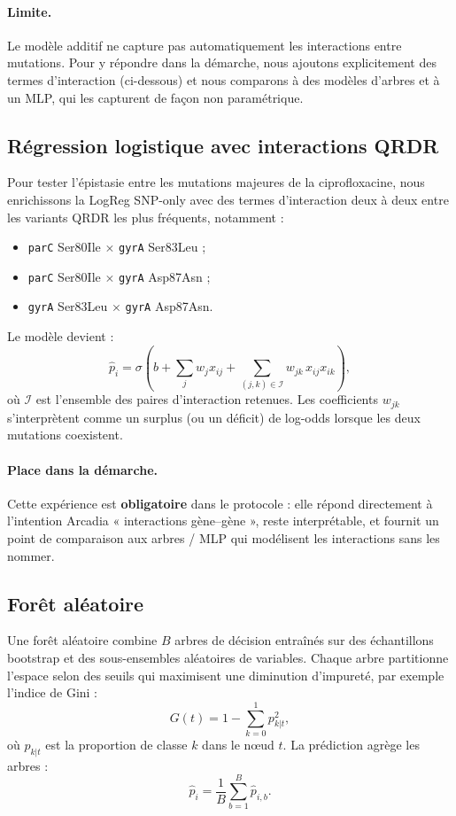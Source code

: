 \documentclass[11pt,a4paper]{article}
\begin{document}
\paragraph{Limite.}
Le modèle additif ne capture pas automatiquement les interactions entre mutations. Pour y répondre dans la démarche, nous ajoutons explicitement des termes d'interaction (ci-dessous) et nous comparons à des modèles d'arbres et à un MLP, qui les capturent de façon non paramétrique.

\subsection{Régression logistique avec interactions QRDR}

Pour tester l'épistasie entre les mutations majeures de la ciprofloxacine, nous enrichissons la LogReg SNP-only avec des termes d'interaction deux à deux entre les variants QRDR les plus fréquents, notamment :
\begin{itemize}[leftmargin=1.2em]
    \item \texttt{parC} Ser80Ile $\times$ \texttt{gyrA} Ser83Leu ;
    \item \texttt{parC} Ser80Ile $\times$ \texttt{gyrA} Asp87Asn ;
    \item \texttt{gyrA} Ser83Leu $\times$ \texttt{gyrA} Asp87Asn.
\end{itemize}
Le modèle devient :
\[
\hat p_i = \sigma\!\left(
b + \sum_j w_j x_{ij} + \sum_{(j,k)\in\mathcal{I}} w_{jk}\, x_{ij}x_{ik}
\right),
\]
où \(\mathcal{I}\) est l'ensemble des paires d'interaction retenues. Les coefficients \(w_{jk}\) s'interprètent comme un surplus (ou un déficit) de log-odds lorsque les deux mutations coexistent.

\paragraph{Place dans la démarche.}
Cette expérience est \textbf{obligatoire} dans le protocole : elle répond directement à l'intention Arcadia « interactions gène--gène », reste interprétable, et fournit un point de comparaison aux arbres / MLP qui modélisent les interactions sans les nommer.

\subsection{Forêt aléatoire}

Une forêt aléatoire \citep{breiman2001} combine \(B\) arbres de décision entraînés sur des échantillons bootstrap et des sous-ensembles aléatoires de variables. Chaque arbre partitionne l'espace selon des seuils qui maximisent une diminution d'impureté, par exemple l'indice de Gini :
\[
G(t) = 1 - \sum_{k=0}^{1} p_{k|t}^2,
\]
où \(p_{k|t}\) est la proportion de classe \(k\) dans le nœud \(t\). La prédiction agrège les arbres :
\[
\hat p_i = \frac{1}{B}\sum_{b=1}^B \hat p_{i,b}.
\]
\end{document}
